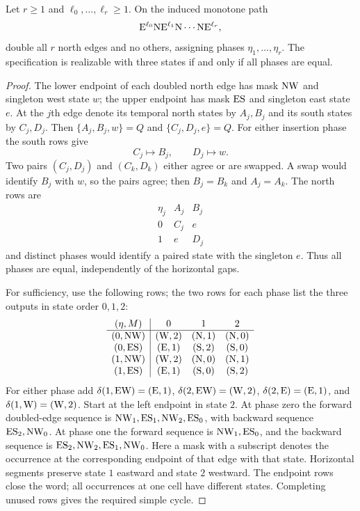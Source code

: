 \begin{theorem}\label{thm:phase-locking}
Let $r\ge1$ and $\ell_0,\ldots,\ell_r\ge1$. On the induced monotone path
\[
 \mathrm{E}^{\ell_0}\mathrm{N}\mathrm{E}^{\ell_1}\mathrm{N}\cdots\mathrm{N}\mathrm{E}^{\ell_r},
\]
double all $r$ north edges and no others, assigning phases $\eta_1,\ldots,\eta_r$.
The specification is realizable with three states if and only if all phases are equal.
\end{theorem}
\begin{proof}
The lower endpoint of each doubled north edge has mask $\mathrm{N}\mathrm{W}$ and singleton west
state $w$; the upper endpoint has mask $\mathrm{E}\mathrm{S}$ and singleton east state $e$.
At the $j$th edge denote its temporal north states by $A_j,B_j$ and its south
states by $C_j,D_j$. Then
$\{A_j,B_j,w\}=Q$ and $\{C_j,D_j,e\}=Q$.
For either insertion phase the south rows give
\[
 C_j\longmapsto B_j,\qquad D_j\longmapsto w.
\]
Two pairs $(C_j,D_j)$ and $(C_k,D_k)$ either agree or are swapped.
A swap would identify $B_j$ with $w$, so the pairs agree; then $B_j=B_k$ and
$A_j=A_k$. The north rows are
\[
\begin{array}{c|cc}
\eta_j& A_j & B_j\\\hline
0&C_j&e\\
1&e&D_j
\end{array}
\]
and distinct phases would identify a paired state with the singleton $e$.
Thus all phases are equal, independently of the horizontal gaps.

For sufficiency, use the following rows; the two rows for each phase list the
three outputs in state order $0,1,2$:
\[
\begin{array}{c|ccc}
 (\eta,M)&0&1&2\\\hline
 (0,\mathrm{N}\mathrm{W})&(\mathrm{W},2)&(\mathrm{N},1)&(\mathrm{N},0)\\
 (0,\mathrm{E}\mathrm{S})&(\mathrm{E},1)&(\mathrm{S},2)&(\mathrm{S},0)\\
 (1,\mathrm{N}\mathrm{W})&(\mathrm{W},2)&(\mathrm{N},0)&(\mathrm{N},1)\\
 (1,\mathrm{E}\mathrm{S})&(\mathrm{E},1)&(\mathrm{S},0)&(\mathrm{S},2)
\end{array}
\]
For either phase add
$\delta(1,\mathrm{E}\mathrm{W})=(\mathrm{E},1)$, $\delta(2,\mathrm{E}\mathrm{W})=(\mathrm{W},2)$,
$\delta(2,\mathrm{E})=(\mathrm{E},1)$, and $\delta(1,\mathrm{W})=(\mathrm{W},2)$.
Start at the left endpoint in state $2$. At phase zero the forward doubled-edge
sequence is $\mathrm{N}\mathrm{W}_1,\mathrm{E}\mathrm{S}_1,\mathrm{N}\mathrm{W}_2,\mathrm{E}\mathrm{S}_0$, with backward sequence
$\mathrm{E}\mathrm{S}_2,\mathrm{N}\mathrm{W}_0$. At phase one the forward sequence is
$\mathrm{N}\mathrm{W}_1,\mathrm{E}\mathrm{S}_0$, and the backward sequence is
$\mathrm{E}\mathrm{S}_2,\mathrm{N}\mathrm{W}_2,\mathrm{E}\mathrm{S}_1,\mathrm{N}\mathrm{W}_0$.
Here a mask with a subscript denotes the occurrence at the corresponding endpoint
of that edge with that state. Horizontal segments preserve state $1$ eastward and
state $2$ westward. The endpoint rows close the word; all occurrences at one cell
have different states. Completing unused rows gives the required simple cycle.
\end{proof}


